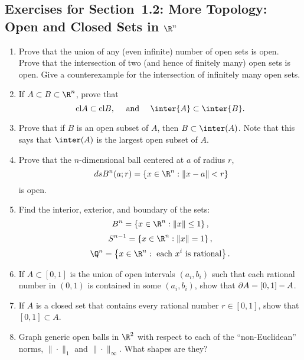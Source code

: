 \subsection*{Exercises for Section~1.2: More Topology: Open and Closed Sets in
$\R^n$}
\begin{enumerate}
\item\label{topology}	Prove that the union of any (even infinite) number of open sets is open.
 Prove that the intersection of two (and hence of finitely many) open sets is
 open.  Give a counterexample for the intersection of infinitely many open sets.

\item\label{clAB}If $A\subset B\subset\R^n$, prove that
	$$\cl{A}\subset\cl{B},\quad\mbox{ and }\quad\inter{A}\subset\inter{B}.$$

\item	Prove that if $B$ is an open subset of $A$, then $B\subset \inter(A)$.  Note that this says that $\inter(A)$ is the largest open subset of $A$.

\item	\label{openset}Prove that the $n$-dimensional ball centered at $a$ of radius $r$,
	$$\ds B^n(a;r) = \left\{x\in\R^n:\|x-a\|< r\right\}$$ is open.

\item	Find the interior, exterior, and boundary of the sets:
	$$B^n = \left\{x\in\R^n : \|x\| \leq 1\right\},$$
	$$S^{n-1} = \left\{x\in\R^n : \|x\| = 1\right\},$$
	$$\Q^n = \left\{x\in\R^n : \mbox{ each } x^i\mbox{ is rational}\right\}.$$
\begin{soln}
\end{soln}


\item	If $A\subset[0,1]$ is the union of open intervals $(a_i,b_i)$ such that
each rational number in $(0,1)$ is contained in some $(a_i,b_i)$, show that
${{\partial}} A = [0,1] - A$.

\item	If $A$ is a closed set that contains every rational number $r\in[0,1]$,
show that $[0,1]\subset A$.

\item	Graph generic open balls in $\R^2$ with respect to each of the ``non-Euclidean'' norms, $\|\cdot\|_1$ and $\|\cdot\|_\infty$.
What shapes are they?
\begin{soln}
\end{soln}

\end{enumerate}




